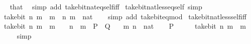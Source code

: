 \begin{isabellebody}
%
\isadelimproof
\ \ %
\endisadelimproof
%
\isatagproof
{}\isamarkupfalse%
\ that\ \isamarkupfalse%
\ {\isacharparenleft}{\kern0pt}simp\ add{\isacharcolon}{\kern0pt}\ take{\isacharunderscore}{\kern0pt}bit{\isacharunderscore}{\kern0pt}nat{\isacharunderscore}{\kern0pt}eq{\isacharunderscore}{\kern0pt}self{\isacharunderscore}{\kern0pt}iff{\isacharparenright}{\kern0pt}%
\endisatagproof
{\isafoldproof}%
%
\isadelimproof
\isanewline
%
\endisadelimproof
\isanewline
{}\isamarkupfalse%
\ take{\isacharunderscore}{\kern0pt}bit{\isacharunderscore}{\kern0pt}nat{\isacharunderscore}{\kern0pt}less{\isacharunderscore}{\kern0pt}eq{\isacharunderscore}{\kern0pt}self\ {\isacharbrackleft}{\kern0pt}simp{\isacharbrackright}{\kern0pt}{\isacharcolon}{\kern0pt}\isanewline
\ \ {\isacartoucheopen}take{\isacharunderscore}{\kern0pt}bit\ n\ m\ {\isasymle}\ m{\isacartoucheclose}\ \ n\ m\ {\isacharcolon}{\kern0pt}{\isacharcolon}{\kern0pt}\ nat\isanewline
%
\isadelimproof
\ \ %
\endisadelimproof
%
\isatagproof
{}\isamarkupfalse%
\ {\isacharparenleft}{\kern0pt}simp\ add{\isacharcolon}{\kern0pt}\ take{\isacharunderscore}{\kern0pt}bit{\isacharunderscore}{\kern0pt}eq{\isacharunderscore}{\kern0pt}mod{\isacharparenright}{\kern0pt}%
\endisatagproof
{\isafoldproof}%
%
\isadelimproof
\isanewline
%
\endisadelimproof
\isanewline
{}\isamarkupfalse%
\ take{\isacharunderscore}{\kern0pt}bit{\isacharunderscore}{\kern0pt}nat{\isacharunderscore}{\kern0pt}less{\isacharunderscore}{\kern0pt}self{\isacharunderscore}{\kern0pt}iff{\isacharcolon}{\kern0pt}\isanewline
\ \ {\isacartoucheopen}take{\isacharunderscore}{\kern0pt}bit\ n\ m\ {\isacharless}{\kern0pt}\ m\ {\isasymlongleftrightarrow}\ {}\ {\isacharcircum}{\kern0pt}\ n\ {\isasymle}\ m{\isacartoucheclose}\ {\isacharparenleft}{\kern0pt}\ {\isacartoucheopen}{\isacharquery}{\kern0pt}P\ {\isasymlongleftrightarrow}\ {\isacharquery}{\kern0pt}Q{\isacartoucheclose}{\isacharparenright}{\kern0pt}\isanewline
\ \ \ m\ n\ {\isacharcolon}{\kern0pt}{\isacharcolon}{\kern0pt}\ nat\isanewline
%
\isadelimproof
%
\endisadelimproof
%
\isatagproof
{}\isamarkupfalse%
\isanewline
\ \ \isamarkupfalse%
\ {\isacharquery}{\kern0pt}P\isanewline
\ \ \isamarkupfalse%
\ \isamarkupfalse%
\ {\isacartoucheopen}take{\isacharunderscore}{\kern0pt}bit\ n\ m\ {\isasymnoteq}\ m{\isacartoucheclose}\isanewline
\ \ \ \ \isamarkupfalse%
\ simp\isanewline
\ \ \isamarkupfalse%

\end{isabellebody}
